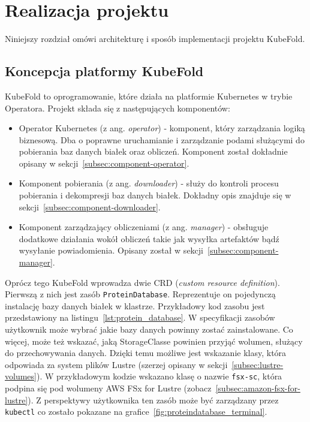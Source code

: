 \chapter{Realizacja projektu}
Niniejszy rozdział omówi architekturę i sposób implementacji projektu KubeFold.


\section{Koncepcja platformy KubeFold}
KubeFold to oprogramowanie, które działa na platformie Kubernetes w trybie Operatora.
Projekt składa się z następujących komponentów:
\begin{itemize}
    \item Operator Kubernetes (z ang. \textit{operator}) - komponent, który zarządzania logiką biznesową.
    Dba o poprawne uruchamianie i zarządzanie podami służącymi do pobierania baz danych białek oraz obliczeń.
    Komponent został dokładnie opisany w sekcji~\ref{subsec:component-operator}.
    \item Komponent pobierania (z ang. \textit{downloader}) - służy do kontroli procesu pobierania i dekompresji baz danych białek.
    Dokładny opis znajduje się w sekcji~\ref{subsec:component-downloader}.
    \item Komponent zarządzający obliczeniami (z ang. \textit{manager}) - obsługuje dodatkowe działania wokół obliczeń takie jak wysyłka artefaktów bądź wysyłanie powiadomienia.
    Opisany został w sekcji~\ref{subsec:component-manager}.
\end{itemize}

Oprócz tego KubeFold wprowadza dwie CRD (\textit{custom resource definition}). Pierwszą z nich jest zasób \texttt{ProteinDatabase}.
Reprezentuje on pojedynczą instalację bazy danych białek w klastrze.
Przykładowy kod zasobu jest przedstawiony na listingu~\ref{lst:protein_database}.
W specyfikacji zasobów użytkownik może wybrać jakie bazy danych powinny zostać zainstalowane.
Co więcej, może też wskazać, jaką StorageClasse powinien przyjąć wolumen, służący do przechowywania danych.
Dzięki temu możliwe jest wskazanie klasy, która odpowiada za system plików Lustre (szerzej opisany w sekcji~\ref{subsec:lustre-volumes}).
W przykładowym kodzie wskazano klasę o nazwie \texttt{fsx-sc}, która podpina się pod wolumeny AWS FSx for Lustre (zobacz~\ref{subsec:amazon-fsx-for-lustre}).
Z perspektywy użytkownika ten zasób może być zarządzany przez \texttt{kubectl} co zostało pokazane na grafice~\ref{fig:proteindatabase_terminal}.

